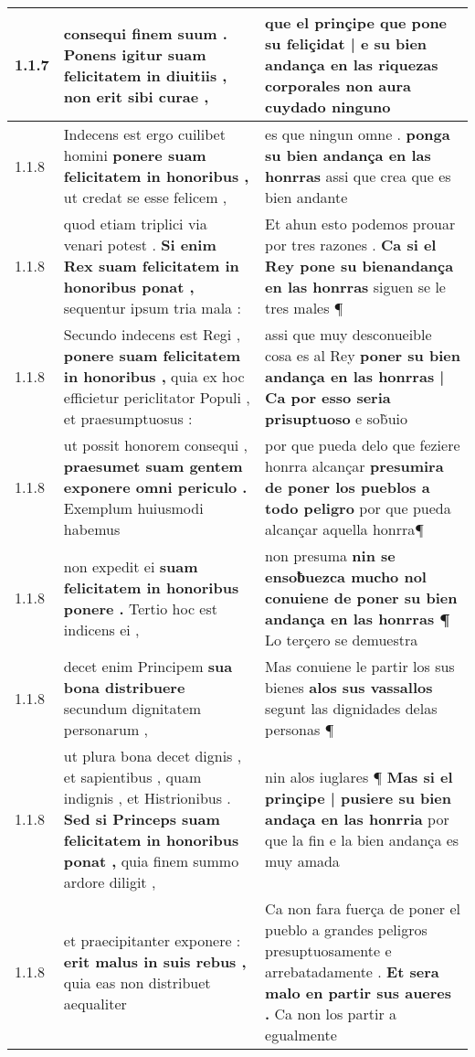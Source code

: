 \begin{tabular}{|p{1cm}|p{6.5cm}|p{6.5cm}|}
1.1.7 & consequi finem suum . \textbf{ Ponens igitur suam felicitatem in diuitiis , } non erit sibi curae , & que el prinçipe \textbf{ que pone su feliçidat | e su bien andança en las riquezas corporales } non aura cuydado ninguno \\\hline
1.1.8 & Indecens est ergo cuilibet homini \textbf{ ponere suam felicitatem in honoribus , } ut credat se esse felicem , & es que ningun omne . \textbf{ ponga su bien andança en las honrras } assi que crea que es bien andante \\\hline
1.1.8 & quod etiam triplici via venari potest . \textbf{ Si enim Rex suam felicitatem in honoribus ponat , } sequentur ipsum tria mala : & Et ahun esto podemos prouar por tres razones . \textbf{ Ca si el Rey pone su bienandança en las honrras } siguen se le tres males ¶ \\\hline
1.1.8 & Secundo indecens est Regi , \textbf{ ponere suam felicitatem in honoribus , } quia ex hoc efficietur periclitator Populi , et praesumptuosus : & assi que muy desconueible cosa es al Rey \textbf{ poner su bien andança en las honrras | Ca por esso seria prisuptuoso } e sob̃uio \\\hline
1.1.8 & ut possit honorem consequi , \textbf{ praesumet suam gentem exponere omni periculo . } Exemplum huiusmodi habemus & por que pueda delo que feziere honrra alcançar \textbf{ presumira de poner los pueblos a todo peligro } por que pueda alcançar aquella honrra¶ \\\hline
1.1.8 & non expedit ei \textbf{ suam felicitatem in honoribus ponere . } Tertio hoc est indicens ei , & non presuma \textbf{ nin se ensoƀuezca mucho nol conuiene de poner su bien andança en las honrras ¶ } Lo terçero se demuestra \\\hline
1.1.8 & decet enim Principem \textbf{ sua bona distribuere } secundum dignitatem personarum , & Mas conuiene le partir los sus bienes \textbf{ alos sus vassallos } segunt las dignidades delas personas ¶ \\\hline
1.1.8 & ut plura bona decet dignis , et sapientibus , quam indignis , et Histrionibus . \textbf{ Sed si Princeps suam felicitatem in honoribus ponat , } quia finem summo ardore diligit , & nin alos iuglares ¶ \textbf{ Mas si el prinçipe | pusiere su bien andaça en las honrria } por que la fin e la bien andança es muy amada \\\hline
1.1.8 & et praecipitanter exponere : \textbf{ erit malus in suis rebus , } quia eas non distribuet aequaliter & Ca non fara fuerça de poner el pueblo a grandes peligros presuptuosamente e arrebatadamente . \textbf{ Et sera malo en partir sus aueres . } Ca non los partir a egualmente \\\hline

\end{tabular}
